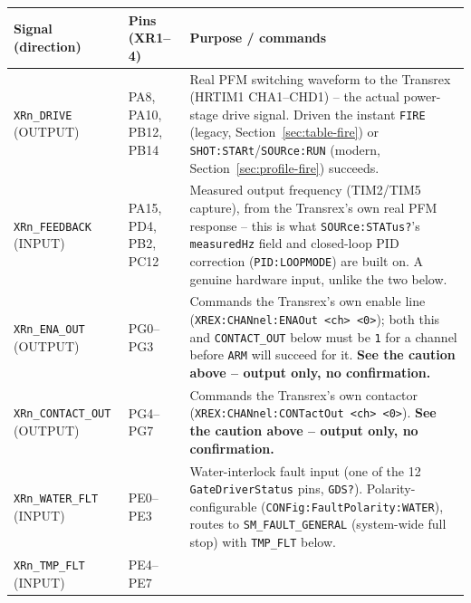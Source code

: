 \documentclass[11pt]{article}
\newcommand{\code}[1]{\texttt{#1}}
\begin{document}
\begin{longtable}{p{1.5in} p{0.95in} p{2.15in}}
  \hline
  \textbf{Signal (direction)} & \textbf{Pins (XR1--4)} & \textbf{Purpose / commands} \\
  \hline
  \endhead
  \code{XRn\_DRIVE} (OUTPUT) & PA8, PA10, PB12, PB14 &
    Real PFM switching waveform to the Transrex (HRTIM1 CHA1--CHD1) --
    the actual power-stage drive signal. Driven the instant \code{FIRE}
    (legacy, Section~\ref{sec:table-fire}) or
    \code{SHOT:STARt}/\code{SOURce:RUN} (modern,
    Section~\ref{sec:profile-fire}) succeeds. \\
  \code{XRn\_FEEDBACK} (INPUT) & PA15, PD4, PB2, PC12 &
    Measured output frequency (TIM2/TIM5 capture), from the Transrex's
    own real PFM response -- this is what \code{SOURce:STATus?}'s
    \code{measuredHz} field and closed-loop PID correction
    (\code{PID:LOOPMODE}) are built on. A genuine hardware input,
    unlike the two below. \\
  \code{XRn\_ENA\_OUT} (OUTPUT) & PG0--PG3 &
    Commands the Transrex's own enable line
    (\code{XREX:CHANnel:ENAOut <ch> <0\textbar 1>}); both this and
    \code{CONTACT\_OUT} below must be \code{1} for a channel before
    \code{ARM} will succeed for it. \textbf{See the caution above --
    output only, no confirmation.} \\
  \code{XRn\_CONTACT\_OUT} (OUTPUT) & PG4--PG7 &
    Commands the Transrex's own contactor
    (\code{XREX:CHANnel:CONTactOut <ch> <0\textbar 1>}). \textbf{See
    the caution above -- output only, no confirmation.} \\
  \code{XRn\_WATER\_FLT} (INPUT) & PE0--PE3 &
    Water-interlock fault input (one of the 12 \code{GateDriverStatus}
    pins, \code{GDS?}). Polarity-configurable
    (\code{CONFig:FaultPolarity:WATER}), routes to
    \code{SM\_FAULT\_GENERAL} (system-wide full stop) with
    \code{TMP\_FLT} below. \\
  \code{XRn\_TMP\_FLT} (INPUT) & PE4--PE7 &

\end{longtable}
\end{document}
